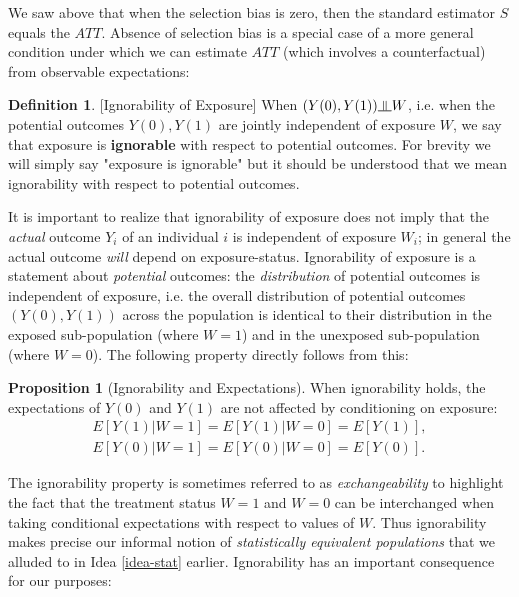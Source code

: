 \documentclass[11pt,a4paper]{article}
\newcommand{\indep}{\rotatebox[origin=c]{90}{$\models$}}
\theoremstyle{definition}
\newtheorem{definition}{Definition}[section]
\theoremstyle{remark}
\theoremstyle{definition}
\theoremstyle{definition}
\theoremstyle{definition}
\theoremstyle{definition}
\theoremstyle{definition}
\theoremstyle{definition}
\newtheorem{proposition}[theorem]{Proposition}
\begin{document}
We saw above that when the selection bias is zero, then the standard estimator $S$ equals the $ATT$. Absence of selection bias is a special case of a more general condition under which we can estimate $ATT$ (which involves a counterfactual) from observable expectations:

\begin{definition}\small [Ignorability of Exposure] \label{def-ignor}
	When $(Y(0), Y(1) ) \indep W$, i.e. when the potential outcomes $Y(0), Y(1)$ are jointly independent of exposure $W$, we say that exposure is {\bf ignorable} with respect to potential outcomes. For brevity we will simply say "exposure is ignorable" but it should be understood that we mean ignorability with respect to potential outcomes.
\end{definition}

It is important to realize that ignorability of exposure does not imply that the \textit{actual} outcome $Y_i$ of an individual $i$ is independent of exposure $W_i$; 
in general the actual outcome \textit{will} depend on exposure-status. Ignorability of exposure is a statement about \textit{potential} outcomes: 
the \textit{distribution} of potential outcomes is independent of exposure, i.e. the overall distribution of potential outcomes $(Y(0), Y(1))$ across the population is identical to their distribution in the exposed sub-population (where $W=1$) and in the unexposed sub-population (where $W=0$). The following property directly follows from this:

\begin{proposition}[Ignorability and Expectations]\label{prop-ignor}\small
When ignorability holds, the expectations of $Y(0)$ and $Y(1)$ are not affected by conditioning on exposure:
\begin{eqnarray} 
  E[Y(1) | W=1] = E[ Y(1) | W = 0] = E[Y(1)],\\
  E[Y(0) | W=1] = E[ Y(0) | W = 0] = E[Y(0)].  \label{eq-ignor}
\end{eqnarray}

	
\end{proposition}



The ignorability property is sometimes referred to as {\em exchangeability} to highlight the fact that the treatment status $W=1$ and $W=0$ can be interchanged when taking conditional expectations with respect to values of $W$. 
Thus ignorability makes precise our informal notion of {\em statistically equivalent populations} that we alluded to in Idea \ref{idea-stat} earlier. Ignorability has an important consequence for our purposes:
\end{document}
